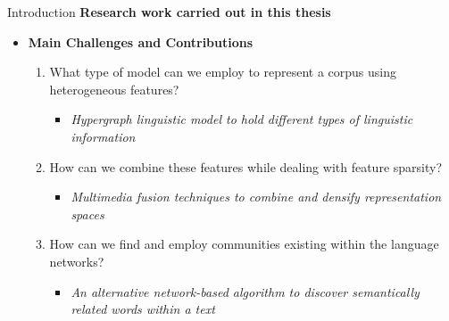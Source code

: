 \documentclass[10pt,xcolor=table]{beamer}
\begin{document}
\begin{frame}{Introduction}
\large  \textbf{Research work carried out in this thesis} \hfill
  \begin{itemize}%
    \item \textbf{Main Challenges and Contributions}
    	    \begin{enumerate}%
    	    	 \item What type of model can we employ to represent a corpus using heterogeneous features?
	    	    	 \begin{itemize}
	    	    	 \item \textit{Hypergraph linguistic model to hold different types of  linguistic information}
	    	    	 \end{itemize}
	    	    	 
    	    	 \item How can we combine these features while dealing with feature sparsity?
	    	    	 \begin{itemize}
	    	    	 \item \textit{Multimedia fusion techniques to combine and densify representation spaces}	    	 
	    	    	 \end{itemize}
    	    	 \item How can we find and employ communities existing within the language networks?
    	    	 \begin{itemize}
    	    	 \item \textit{An alternative network-based algorithm to discover semantically related words within a text}
    	     	 \end{itemize}
    	    	 
        	\end{enumerate}%
    


  \end{itemize}
 \vspace{\textheight}
\end{frame}
\end{document}
